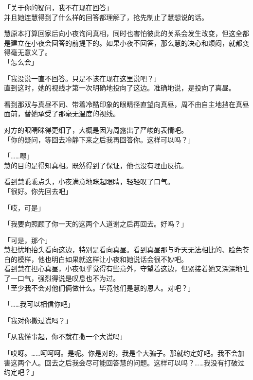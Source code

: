 「关于你的疑问，我不在现在回答」\\

并且她连慧得到了什么样的回答都理解了，抢先制止了慧想说的话。

慧原本打算回家后向小夜询问真相，同时也害怕彼此的关系会发生改变，但这全都是建立在小夜会回答的前提下的。如果小夜不回答，那么慧的决心和烦闷，就都变得毫无意义了。\\

「怎么会」

「我没说一直不回答。只是不该在现在这里说吧？」\\

直到这时，她的视线才第一次明确地投向了这边。准确地说，是投向了真昼。

看到那双与真昼不同、带着冷酷印象的眼睛径直望向真昼，周不由自主地挡在真昼面前，替她承受了那毫无温度的视线。

对方的眼睛眯得更细了，大概是因为周露出了严峻的表情吧。\\

「你的疑问，等回去冷静下来之后我再回答你。这样可以吗？」

「……嗯」\\

慧的目的是得知真相。既然得到了保证，他也没有理由反抗。

看到慧乖乖点头，小夜满意地眯起眼睛，轻轻叹了口气。\\

「很好。你先回去吧」

「哎，可是」

「我要向照顾了你一天的这两个人道谢之后再回去。好吗？」

「可是，那个」\\

慧担忧地抬头看向这边，特别是看向真昼。看到真昼那与昨天无法相比的、脸色苍白的模样，他也明白如果就这样让小夜和她说话会很不妙吧。\\

看到慧在担心真昼，小夜似乎觉得有些意外，守望着这边，但紧接着她又深深地吐了一口气，强烈得说是叹息也不为过。\\

「至少我不会对他们俩做什么。毕竟他们是慧的恩人。对吧？」

「……我可以相信你吧」

「我对你撒过谎吗？」

「从我懂事起，你不就在撒一个大谎吗」

「哎呀。……呵呵呵。是呢。你是对的，我是个大骗子。那就约定好吧。我不会加害这两个人。回去之后我会尽可能回答慧的问题。这样可以吗？……我没有打破过约定吧？」

